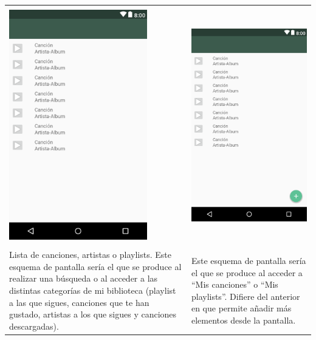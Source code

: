 \begin{tabular}{ p{6cm} p{6cm}}
\hline
\\
\includegraphics[width=6cm]{Figures/android/lista-no-personal.png}
&
\includegraphics[width=6cm]{Figures/android/lista-personal.png} \\
\hline
\\
Lista de canciones, artistas o playlists. Este esquema de pantalla sería el que se produce al realizar una búsqueda o al acceder a las distintas categorías de mi biblioteca (playlist a las que sigues, canciones que te han gustado, artistas a los que sigues y canciones descargadas).
&
Este esquema de pantalla sería el que se produce al acceder a “Mis canciones” o “Mis playlists”.
Difiere del anterior en que permite añadir más elementos desde la pantalla. \\
\hline
\end{tabular}

